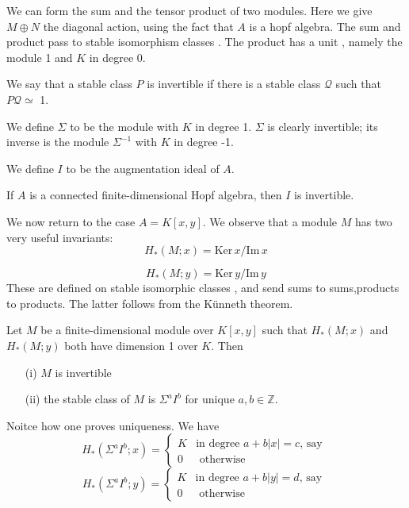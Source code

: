 \documentclass[../main]{subfiles}
\begin{document}
    We can form the sum and the tensor product of two modules. Here we give $M \oplus N$ the diagonal action, using the fact that $A$ is a hopf algebra. The sum and product pass to stable isomorphism classes . The product has a unit , namely the module 1 and $K$ in degree 0.
    
    We say that a stable class $P$ is invertible if there is a stable class $\mathcal{Q}$ such that $P\mathcal{Q}\simeq$ 1. 
    
    We define $\Sigma$ to be the module with $K$ in degree 1. $\Sigma$ is clearly invertible; its inverse is the module $\Sigma^{-1}$ with $K$ in degree -1. 
    
    We define $I$ to be the augmentation ideal of $A$.
    
    \begin{customlemma}{16.2} \label{lem:p3ch16.2}
     If $A$ is a connected finite-dimensional Hopf algebra, then $I$ is invertible. 
    \end{customlemma}
    We now return to the case $A=K[x,y]$. We observe that a module $M$ has two very useful invariants:
    \[ H_{\ast}(M;x)= \mathrm{Ker} \, x/\mathrm{Im} \, x \]
    
    \[ H_{\ast}(M;y)= \mathrm{Ker} \, y/\mathrm{Im} \, y \]
    These are defined on stable isomorphic classes , and send sums to sums,products to products. The latter follows from the Künneth theorem. 
    
    \begin{customthm}{16.3} \label{thm:p3ch16.3}
    Let $M$ be a finite-dimensional module over $K[x,y]$ such that $H_{\ast}(M;x)$ and $H_{\ast}(M;y)$ both have dimension 1 over $K$. Then
    \begin{enumerate}
        \item[(i)] $M$ is invertible
        \item[(ii)] the stable class of $M$ is $\Sigma^{a}I^{b}$ for unique $a,b\in \mathbb Z$. 
    \end{enumerate}
    \end{customthm}
    Noitce how one proves uniqueness. We have
    \[ H_{\ast}(\Sigma^{a}I^{b};x)= \begin{cases}
        K &\text{in degree $a+b|x|=c$, say } \\
        0 &\text{ otherwise}
    \end{cases} \]
    \[ H_{\ast}(\Sigma^{a}I^{b};y)= \begin{cases}
        K &\text{in degree $a+b|y|=d$, say } \\
        0 &\text{ otherwise}
    \end{cases} \]
    
\end{document}
